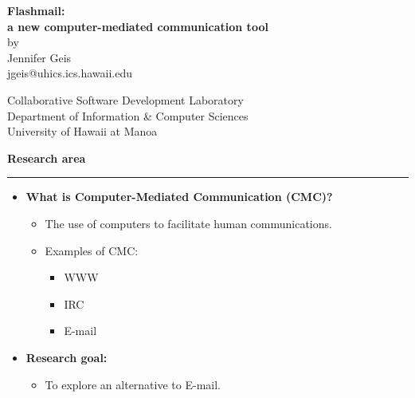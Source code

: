 \newcommand{\horizontalline} {\rule{\textwidth}{.02in}} 
\pagestyle{empty}
      

\begin{slide} \Huge 
  \begin{center} 
    {\bf Flashmail:\\ a new computer-mediated communication tool}\\

    \vspace{0.5in} by\\ Jennifer Geis\\ jgeis@uhics.ics.hawaii.edu
    \vspace{0.5in}
    
    Collaborative Software Development Laboratory \\ Department of
    Information \& Computer Sciences\\ University of Hawaii at Manoa
  \end{center} 
\end{slide} \Huge   


\begin{slide}\Huge 
  {\bf Research area} \horizontalline
  \begin{itemize}\huge
  \item {\bf What is Computer-Mediated Communication (CMC)? \ }
    \begin {itemize}
  \item The use of computers to facilitate human communications.
  \end{itemize}
  \begin {itemize}
\item Examples of CMC:
  \begin {itemize}
\item WWW \item IRC \item E-mail
  \end {itemize}
  \end {itemize}
\item {\bf Research goal:}
  \begin{itemize}
  \item To explore an alternative to E-mail.
  \end{itemize}
\end{itemize}
\end{slide}



